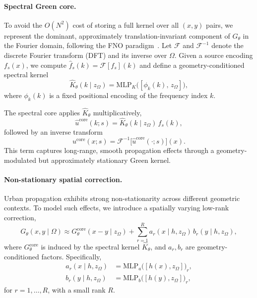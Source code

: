 \documentclass{article}
\begin{document}
\paragraph{Spectral Green core.}
To avoid the $O(N^2)$ cost of storing a full kernel over all $(x, y)$ pairs,
we represent the dominant, approximately translation-invariant component of
$G_\theta$ in the Fourier domain, following the FNO paradigm~\cite{li2020fourier,li2021physics}.
Let $\mathcal{F}$ and $\mathcal{F}^{-1}$ denote the discrete Fourier transform (DFT)
and its inverse over $\Omega$.
Given a source encoding $f_s(x)$, we compute
$\hat{f}_s(k) = \mathcal{F}[f_s](k)$ and define a geometry-conditioned spectral kernel
\begin{equation}
\hat{K}_\theta(k \mid z_\Omega)
= \mathrm{MLP}_K\big([\phi_k(k),\, z_\Omega]\big),
\label{eq:spec_kernel}
\end{equation}
where $\phi_k(k)$ is a fixed positional encoding of the frequency index $k$.

The spectral core applies $\hat{K}_\theta$ multiplicatively,
\begin{equation}
\hat{u}^{\text{core}}(k; s)
= \hat{K}_\theta(k \mid z_\Omega)\,\hat{f}_s(k),
\end{equation}
followed by an inverse transform
\begin{equation}
u^{\text{core}}(x; s)
= \mathcal{F}^{-1}\big[\hat{u}^{\text{core}}(\cdot; s)\big](x).
\end{equation}
This term captures long-range, smooth propagation effects through
a geometry-modulated but approximately stationary Green kernel.

\vspace{0.3em}
\paragraph{Non-stationary spatial correction.}
Urban propagation exhibits strong non-stationarity across different geometric contexts.
To model such effects, we introduce a spatially varying low-rank correction,
\begin{equation}
G_\theta(x, y \mid \Omega)
\approx G^{\text{core}}_\theta(x-y \mid z_\Omega)
+ \sum_{r=1}^R a_r(x \mid h, z_\Omega)\, b_r(y \mid h, z_\Omega),
\label{eq:low_rank_green}
\end{equation}
where $G^{\text{core}}_\theta$ is induced by the spectral kernel
$\hat{K}_\theta$, and $a_r, b_r$ are geometry-conditioned factors.
Specifically,
\begin{align}
a_r(x \mid h, z_\Omega)
&= \mathrm{MLP}_a\big([h(x), z_\Omega]\big)_r,\\
b_r(y \mid h, z_\Omega)
&= \mathrm{MLP}_b\big([h(y), z_\Omega]\big)_r,
\end{align}
for $r = 1,\dots, R$, with a small rank $R$.
\end{document}
